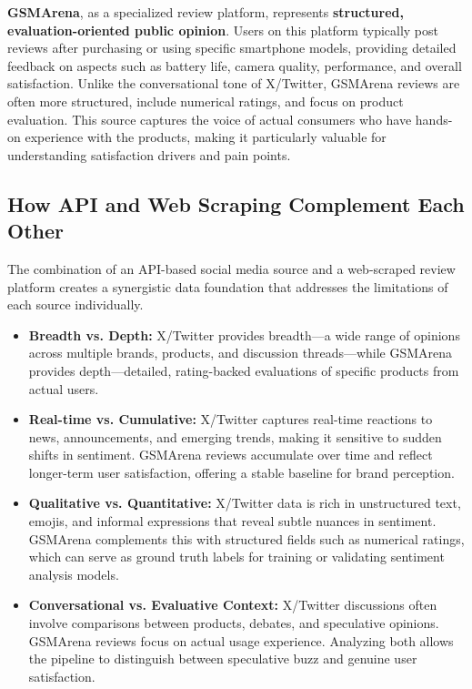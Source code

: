 \documentclass[12pt]{article}
\begin{document}
\textbf{GSMArena}, as a specialized review platform, represents \textbf{structured, evaluation-oriented public opinion}. Users on this platform typically post reviews after purchasing or using specific smartphone models, providing detailed feedback on aspects such as battery life, camera quality, performance, and overall satisfaction. Unlike the conversational tone of X/Twitter, GSMArena reviews are often more structured, include numerical ratings, and focus on product evaluation. This source captures the voice of actual consumers who have hands-on experience with the products, making it particularly valuable for understanding satisfaction drivers and pain points.

\subsection{How API and Web Scraping Complement Each Other}
The combination of an API-based social media source and a web-scraped review platform creates a synergistic data foundation that addresses the limitations of each source individually.

\begin{itemize}
\item \textbf{Breadth vs. Depth:} X/Twitter provides breadth—a wide range of opinions across multiple brands, products, and discussion threads—while GSMArena provides depth—detailed, rating-backed evaluations of specific products from actual users.

\item \textbf{Real-time vs. Cumulative:} X/Twitter captures real-time reactions to news, announcements, and emerging trends, making it sensitive to sudden shifts in sentiment. GSMArena reviews accumulate over time and reflect longer-term user satisfaction, offering a stable baseline for brand perception.

\item \textbf{Qualitative vs. Quantitative:} X/Twitter data is rich in unstructured text, emojis, and informal expressions that reveal subtle nuances in sentiment. GSMArena complements this with structured fields such as numerical ratings, which can serve as ground truth labels for training or validating sentiment analysis models.

\item \textbf{Conversational vs. Evaluative Context:} X/Twitter discussions often involve comparisons between products, debates, and speculative opinions. GSMArena reviews focus on actual usage experience. Analyzing both allows the pipeline to distinguish between speculative buzz and genuine user satisfaction.
\end{itemize}
\end{document}
